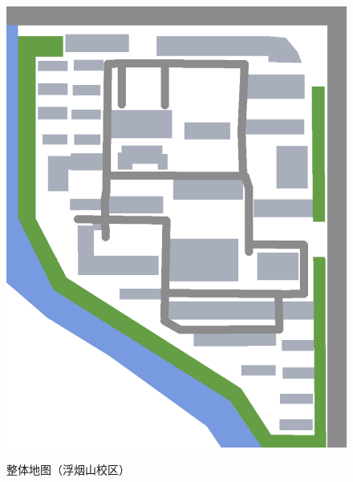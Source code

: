 \noindent\begin{figure}[H]
    \centering
    \caption[map_all]{整体地图（浮烟山校区）}
    \vspace{1em}
    \noindent\includegraphics*[width = \linewidth]{虞河校区地图.pdf}
    \label{map_y}
\end{figure}

